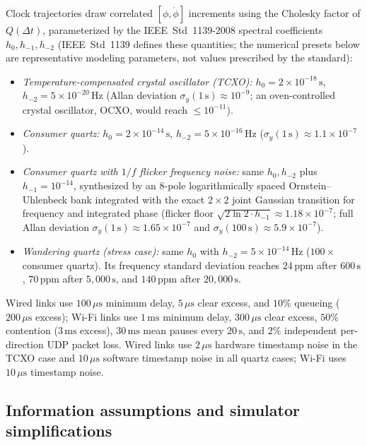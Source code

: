 \documentclass[11pt,a4paper]{article}
\theoremstyle{definition}
\begin{document}
Clock trajectories draw correlated $[\phi, \dot\phi]$ increments using the
Cholesky factor of $Q(\Delta t)$, parameterized by the IEEE~Std~1139-2008
spectral coefficients $h_0, h_{-1}, h_{-2}$ \cite{ieee1139} (IEEE~Std~1139
defines these quantities; the numerical presets below are representative
modeling parameters, not values prescribed by the standard):
\begin{itemize}
\item \emph{Temperature-compensated crystal oscillator (TCXO):}
  $h_0 = 2\times 10^{-18}\,\text{s}$, $h_{-2} = 5\times 10^{-20}\,\text{Hz}$
  (Allan deviation $\sigma_y(1\,\text{s}) \approx 10^{-9}$; an oven-controlled
  crystal oscillator, OCXO, would reach $\le 10^{-11}$).
\item \emph{Consumer quartz:} $h_0 = 2\times 10^{-14}\,\text{s}$,
  $h_{-2} = 5\times 10^{-16}\,\text{Hz}$ ($\sigma_y(1\,\text{s}) \approx 1.1\times 10^{-7}$).
\item \emph{Consumer quartz with $1/f$ flicker frequency noise:} same $h_0, h_{-2}$
  plus $h_{-1} = 10^{-14}$, synthesized by an 8-pole logarithmically spaced
  Ornstein--Uhlenbeck bank \cite{barnes1971} integrated with the exact $2 \times 2$
  joint Gaussian transition for frequency and integrated phase (flicker floor
  $\sqrt{2\ln 2 \cdot h_{-1}} \approx 1.18\times 10^{-7}$; full Allan deviation
  $\sigma_y(1\,\text{s}) \approx 1.65\times 10^{-7}$ and
  $\sigma_y(100\,\text{s}) \approx 5.9\times 10^{-7}$).
\item \emph{Wandering quartz (stress case):} same $h_0$ with
  $h_{-2} = 5\times 10^{-14}\,\text{Hz}$ ($100\times$ consumer quartz). Its
  frequency standard deviation reaches $24\,\text{ppm}$ after $600\,\text{s}$,
  $70\,\text{ppm}$ after $5{,}000\,\text{s}$, and $140\,\text{ppm}$ after
  $20{,}000\,\text{s}$.
\end{itemize}
Wired links use $100\,\mu\text{s}$ minimum delay, $5\,\mu\text{s}$ clear
excess, and $10\%$ queueing ($200\,\mu\text{s}$ excess); Wi-Fi links use
$1\,\text{ms}$ minimum delay, $300\,\mu\text{s}$ clear excess, $50\%$
contention ($3\,\text{ms}$ excess), $30\,\text{ms}$ mean pauses every
$20\,\text{s}$, and $2\%$ independent per-direction UDP packet loss. Wired
links use $2\,\mu\text{s}$ hardware timestamp noise in the TCXO case and
$10\,\mu\text{s}$ software timestamp noise in all quartz cases; Wi-Fi uses
$10\,\mu\text{s}$ timestamp noise.

\subsection{Information assumptions and simulator simplifications}
\label{sec:sim-assumptions}
\end{document}
